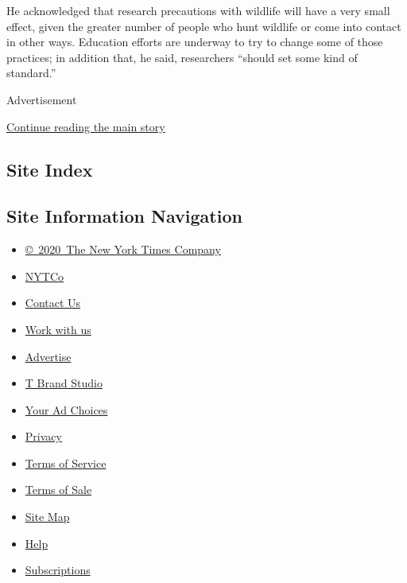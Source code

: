 He acknowledged that research precautions with wildlife will have a very
small effect, given the greater number of people who hunt wildlife or
come into contact in other ways. Education efforts are underway to try
to change some of those practices; in addition that, he said,
researchers ``should set some kind of standard.''

Advertisement

\protect\hyperlink{after-bottom}{Continue reading the main story}

\hypertarget{site-index}{%
\subsection{Site Index}\label{site-index}}

\hypertarget{site-information-navigation}{%
\subsection{Site Information
Navigation}\label{site-information-navigation}}

\begin{itemize}
\tightlist
\item
  \href{https://help.nytimes.com/hc/en-us/articles/115014792127-Copyright-notice}{©~2020~The
  New York Times Company}
\end{itemize}

\begin{itemize}
\tightlist
\item
  \href{https://www.nytco.com/}{NYTCo}
\item
  \href{https://help.nytimes.com/hc/en-us/articles/115015385887-Contact-Us}{Contact
  Us}
\item
  \href{https://www.nytco.com/careers/}{Work with us}
\item
  \href{https://nytmediakit.com/}{Advertise}
\item
  \href{http://www.tbrandstudio.com/}{T Brand Studio}
\item
  \href{https://www.nytimes.com/privacy/cookie-policy\#how-do-i-manage-trackers}{Your
  Ad Choices}
\item
  \href{https://www.nytimes.com/privacy}{Privacy}
\item
  \href{https://help.nytimes.com/hc/en-us/articles/115014893428-Terms-of-service}{Terms
  of Service}
\item
  \href{https://help.nytimes.com/hc/en-us/articles/115014893968-Terms-of-sale}{Terms
  of Sale}
\item
  \href{https://spiderbites.nytimes.com}{Site Map}
\item
  \href{https://help.nytimes.com/hc/en-us}{Help}
\item
  \href{https://www.nytimes.com/subscription?campaignId=37WXW}{Subscriptions}
\end{itemize}
